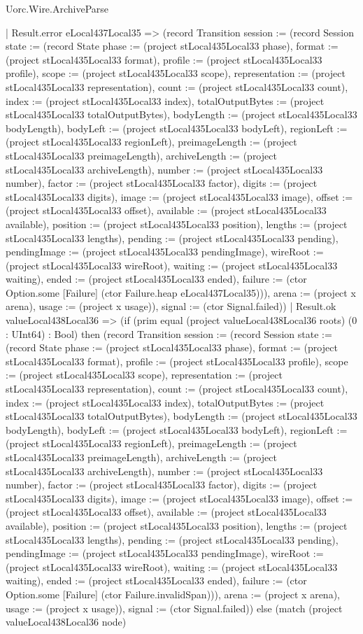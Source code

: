 \begin{lexlean}{Uorc.Wire.ArchiveParse}
\begin{semanticmodule}
{      | Result.error eLocal437Local35 => (record Transition {session := (record Session {state := (record State {phase := (project stLocal435Local33 phase), format := (project stLocal435Local33 format), profile := (project stLocal435Local33 profile), scope := (project stLocal435Local33 scope), representation := (project stLocal435Local33 representation), count := (project stLocal435Local33 count), index := (project stLocal435Local33 index), totalOutputBytes := (project stLocal435Local33 totalOutputBytes), bodyLength := (project stLocal435Local33 bodyLength), bodyLeft := (project stLocal435Local33 bodyLeft), regionLeft := (project stLocal435Local33 regionLeft), preimageLength := (project stLocal435Local33 preimageLength), archiveLength := (project stLocal435Local33 archiveLength), number := (project stLocal435Local33 number), factor := (project stLocal435Local33 factor), digits := (project stLocal435Local33 digits), image := (project stLocal435Local33 image), offset := (project stLocal435Local33 offset), available := (project stLocal435Local33 available), position := (project stLocal435Local33 position), lengths := (project stLocal435Local33 lengths), pending := (project stLocal435Local33 pending), pendingImage := (project stLocal435Local33 pendingImage), wireRoot := (project stLocal435Local33 wireRoot), waiting := (project stLocal435Local33 waiting), ended := (project stLocal435Local33 ended), failure := (ctor Option.some [Failure] (ctor Failure.heap eLocal437Local35))}), arena := (project x arena), usage := (project x usage)}), signal := (ctor Signal.failed)})
      | Result.ok valueLocal438Local36 => (if (prim equal (project valueLocal438Local36 roots) (0 : UInt64) : Bool) then (record Transition {session := (record Session {state := (record State {phase := (project stLocal435Local33 phase), format := (project stLocal435Local33 format), profile := (project stLocal435Local33 profile), scope := (project stLocal435Local33 scope), representation := (project stLocal435Local33 representation), count := (project stLocal435Local33 count), index := (project stLocal435Local33 index), totalOutputBytes := (project stLocal435Local33 totalOutputBytes), bodyLength := (project stLocal435Local33 bodyLength), bodyLeft := (project stLocal435Local33 bodyLeft), regionLeft := (project stLocal435Local33 regionLeft), preimageLength := (project stLocal435Local33 preimageLength), archiveLength := (project stLocal435Local33 archiveLength), number := (project stLocal435Local33 number), factor := (project stLocal435Local33 factor), digits := (project stLocal435Local33 digits), image := (project stLocal435Local33 image), offset := (project stLocal435Local33 offset), available := (project stLocal435Local33 available), position := (project stLocal435Local33 position), lengths := (project stLocal435Local33 lengths), pending := (project stLocal435Local33 pending), pendingImage := (project stLocal435Local33 pendingImage), wireRoot := (project stLocal435Local33 wireRoot), waiting := (project stLocal435Local33 waiting), ended := (project stLocal435Local33 ended), failure := (ctor Option.some [Failure] (ctor Failure.invalidSpan))}), arena := (project x arena), usage := (project x usage)}), signal := (ctor Signal.failed)}) else (match (project valueLocal438Local36 node)
}
\end{semanticmodule}
\end{lexlean}
